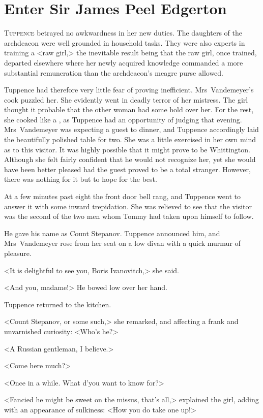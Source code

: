 \chapter{Enter Sir James Peel Edgerton} 

 \lettrine{T}{uppence} betrayed no awkwardness in her new duties. The daughters of the archdeacon were well grounded in household tasks. They were also experts in training a <raw girl,> the inevitable result being that the raw girl, once trained, departed elsewhere where her newly acquired knowledge commanded a more substantial remuneration than the archdeacon's meagre purse allowed.

Tuppence had therefore very little fear of proving inefficient. Mrs~Vandemeyer's cook puzzled her. She evidently went in deadly terror of her mistress. The girl thought it probable that the other woman had some hold over her. For the rest, she cooked like a , as Tuppence had an opportunity of judging that evening. Mrs~Vandemeyer was expecting a guest to dinner, and Tuppence accordingly laid the beautifully polished table for two. She was a little exercised in her own mind as to this visitor. It was highly possible that it might prove to be Whittington. Although she felt fairly confident that he would not recognize her, yet she would have been better pleased had the guest proved to be a total stranger. However, there was nothing for it but to hope for the best.

At a few minutes past eight the front door bell rang, and Tuppence went to answer it with some inward trepidation. She was relieved to see that the visitor was the second of the two men whom Tommy had taken upon himself to follow.

He gave his name as Count Stepanov. Tuppence announced him, and Mrs~Vandemeyer rose from her seat on a low divan with a quick murmur of pleasure.

<It is delightful to see you, Boris Ivanovitch,> she said.

<And you, madame!> He bowed low over her hand.

Tuppence returned to the kitchen.

<Count Stepanov, or some such,> she remarked, and affecting a frank and unvarnished curiosity: <Who's he?>

<A Russian gentleman, I believe.>

<Come here much?>

<Once in a while. What d'you want to know for?>

<Fancied he might be sweet on the missus, that's all,> explained the girl, adding with an appearance of sulkiness: <How you do take one up!>

